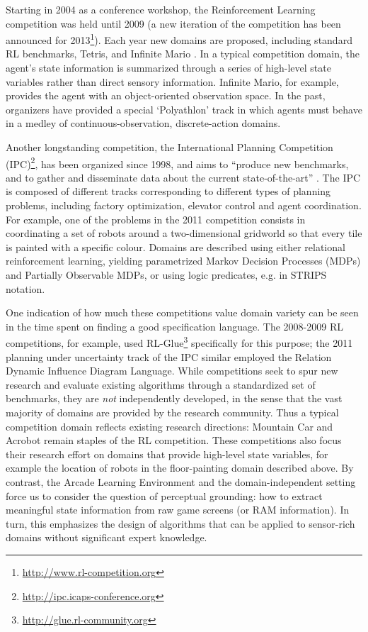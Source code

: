 \documentclass[twoside,11pt]{article}
\begin{document}
Starting in 2004 as a conference workshop, the Reinforcement Learning competition \cite{whiteson10} was held until 2009 (a new iteration of the competition has been announced for 2013\footnote{\url{http://www.rl-competition.org}}). Each year new domains are proposed, including standard RL benchmarks, Tetris, and Infinite Mario \cite{mohan_laird_09}. In a typical competition domain, the agent's state information is summarized through a series of high-level state variables rather than direct sensory information. Infinite Mario, for example, provides the agent with an object-oriented observation space. In the past, organizers have provided a special `Polyathlon' track in which agents must behave in a medley of continuous-observation, discrete-action domains.

Another longstanding competition, the International Planning Competition (IPC)\footnote{\url{http://ipc.icaps-conference.org}}, has been organized since 1998, and aims to ``produce new benchmarks, and to gather and disseminate data about the current state-of-the-art'' \cite{coles_12}. The IPC is composed of different tracks corresponding to different types of planning problems, including factory optimization, elevator control and agent coordination. For example, one of the problems in the 2011 competition consists in coordinating a set of robots around a two-dimensional gridworld so that every tile is painted with a specific colour. Domains are described using either relational reinforcement learning, yielding parametrized Markov Decision Processes (MDPs) and Partially Observable MDPs, or using logic predicates, e.g. in STRIPS notation. 

One indication of how much these competitions value domain variety can be seen in the time spent on finding a good specification language. The 2008-2009 RL competitions, for example, used RL-Glue\footnote{\url{http://glue.rl-community.org}} specifically for this purpose; the 2011 planning under uncertainty track of the IPC similar employed the Relation Dynamic Influence Diagram Language. While competitions seek to spur new research and evaluate existing algorithms through a standardized set of benchmarks, they are \emph{not} independently developed, in the sense that the vast majority of domains are provided by the research community. Thus a typical competition domain reflects existing research directions: Mountain Car and Acrobot remain staples of the RL competition. These competitions also focus their research effort on domains that provide high-level state variables, for example the location of robots in the floor-painting domain described above. By contrast, the Arcade Learning Environment and the domain-independent setting force us to consider the question of perceptual grounding: how to extract meaningful state information from raw game screens (or RAM information). In turn, this emphasizes the design of algorithms that can be applied to sensor-rich domains without significant expert knowledge. 
\end{document}
